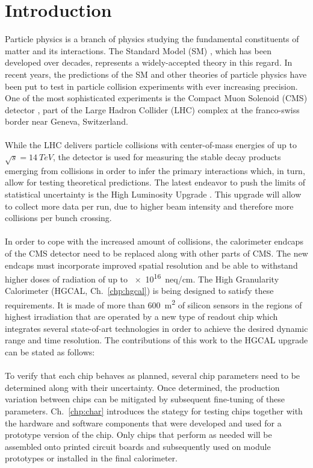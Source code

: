\documentclass[../../main.tex]{subfiles}
\begin{document}
\section{Introduction}
Particle physics is a branch of physics studying the fundamental constituents of matter and its interactions. The Standard Model (SM) \cite{wiki_sm}, which has been developed over decades, represents a widely-accepted theory in this regard. In recent years, the predictions of the SM and other theories of particle physics have been put to test in particle collision experiments with ever increasing precision. One of the most sophisticated experiments is the Compact Muon Solenoid (CMS) detector \cite{about_cms}, part of the Large Hadron Collider (LHC) complex \cite{lhc1, lhc2, lhc2} at the franco-swiss border near Geneva, Switzerland.\\
\\
While the LHC delivers particle collisions with center-of-mass energies of up to $\sqrt{s}=\SI{14}{TeV}$, the detector is used for measuring the stable decay products emerging from collisions in order to infer the primary interactions which, in turn, allow for testing theoretical predictions. The latest endeavor to push the limits of statistical uncertainty is the High Luminosity Upgrade \cite{hl_lhc_tdr}. This upgrade will allow to collect more data per run, due to higher beam intensity and therefore more collisions per bunch crossing.\\
\\
In order to cope with the increased amount of collisions, the calorimeter endcaps of the CMS detector need to be replaced along with other parts of CMS. The new endcaps must incorporate improved spatial resolution and be able to withstand higher doses of radiation of up to \SI{e16}{neq/cm}. The High Granularity Calorimeter \cite{tdr_hgcal} (HGCAL, Ch.~\ref{chp:hgcal}) is being designed to satisfy these requirements. It is made of more than \SI{600}{m^2} of silicon sensors in the regions of highest irradiation that are operated by a new type of readout chip \cite{tdr_roc} which integrates several state-of-art technologies in order to achieve the desired dynamic range and time resolution. The contributions of this work to the HGCAL upgrade can be stated as follows:\\
\\
To verify that each chip behaves as planned, several chip parameters need to be determined along with their uncertainty. Once determined, the production variation between chips can be mitigated by subsequent fine-tuning of these parameters. Ch.~\ref{chp:char} introduces the stategy for testing chips together with the hardware and software components that were developed and used for a prototype version of the chip. Only chips that perform as needed will be assembled onto printed circuit boards and subsequently used on module prototypes or installed in the final calorimeter.\\
\end{document}
